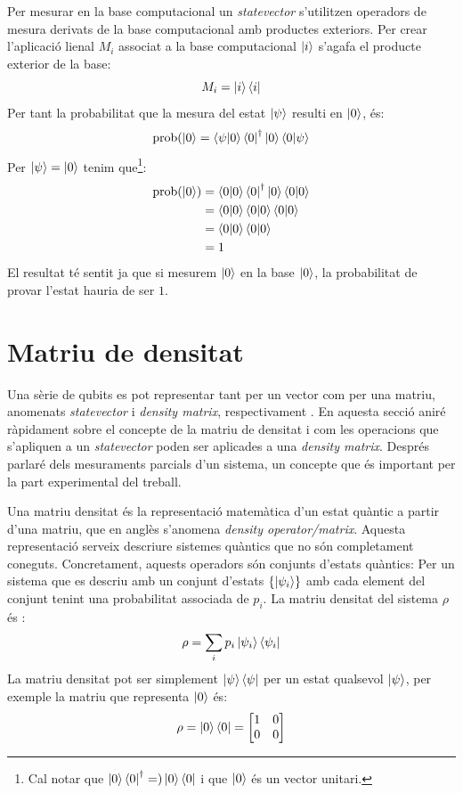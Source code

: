 Per mesurar en la base computacional un \textit{statevector} s'utilitzen operadors de mesura derivats de la base computacional amb productes exteriors. Per crear l'aplicació lienal ${M_i}$ associat a la base computacional $\ket{i}$ s'agafa el producte exterior de la base:
$$
M_i = \ket{i}\bra{i}
$$
Per tant la probabilitat que la mesura del estat $\ket{\psi}$ resulti en $\ket{0}$, és:
$$
\mathrm{prob}(\ket{0} = \bra{\psi}\ket{0}\bra{0}^\dagger \ket{0}\bra{0}\ket{\psi}
$$
Per $\ket{\psi} = \ket{0}$ tenim que\footnote{Cal notar que $\ket{0}\bra{0}^\dagger =) \ket{0}\bra{0}$ i que $\ket{0}$ és un vector unitari.}:
\begin{align*}
	\mathrm{prob}(\ket{0}) &= \bra{0}\ket{0}\bra{0}^\dagger \ket{0}\bra{0}\ket{0} \\
	&= \bra{0}\ket{0}\bra{0} \ket{0}\bra{0}\ket{0} \\
	&= \bra{0}\ket{0}\bra{0}\ket{0} \\
	&= 1
\end{align*}
El resultat té sentit ja que si mesurem $\ket{0}$ en la base $\ket{0}$, la probabilitat de provar l'estat hauria de ser $1$.

\section{Matriu de densitat}
Una sèrie de qubits es pot representar tant per un vector com per una matriu, anomenats \textit{statevector} i \textit{density matrix}, respectivament \cite{QCandQI}.
En aquesta secció aniré ràpidament sobre el concepte de la matriu de densitat i com les operacions que s'apliquen a un \textit{statevector} poden ser aplicades a una \textit{density matrix}. Després parlaré dels mesuraments parcials d'un sistema, un concepte que és important per la part experimental del treball.

Una matriu densitat és la representació matemàtica d'un estat quàntic a partir d'una matriu, que en anglès s'anomena \textit{density operator/matrix}. Aquesta representació serveix descriure sistemes quàntics que no són completament coneguts. Concretament, aquests operadors són conjunts d'estats quàntics: Per un sistema que es descriu amb un conjunt d'estats $\{\ket{\psi_i}\}$ amb cada element del conjunt tenint una probabilitat associada de $p_i$. La matriu densitat del sistema $\rho$ és \cite{QCandQI:density_matrix}:
$$
\rho = \sum_i p_i\ket{\psi_i}\bra{\psi_i}
$$
La matriu densitat pot ser simplement $\ket{\psi}\bra{\psi}$ per un estat qualsevol $\ket{\psi}$, per exemple la matriu que representa $\ket{0}$ és:
$$
\rho = \ket{0}\bra{0} = \begin{bmatrix}
	1 & 0 \\
	0 & 0 
\end{bmatrix}
$$

